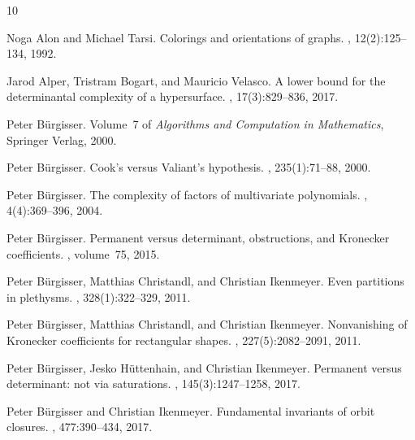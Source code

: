 \documentclass[11pt]{amsart}
\numberwithin{equation}{section}
\begin{document}

\def\cprime{$'$}
\begin{thebibliography}{10}

Noga Alon and Michael Tarsi.
\newblock Colorings and orientations of graphs.
, 12(2):125--134, 1992.

Jarod Alper, Tristram Bogart, and Mauricio Velasco.
\newblock A lower bound for the determinantal complexity of a hypersurface.
, 17(3):829--836, 2017.

Peter B{\"u}rgisser.
\newblock Volume~7 of {\em {A}lgorithms and {C}omputation in {M}athematics}, 
 Springer Verlag, 2000.

Peter B{\"u}rgisser.
\newblock Cook's versus {V}aliant's hypothesis.
, 235(1):71--88, 2000.

Peter B\"urgisser.
\newblock The complexity of factors of multivariate polynomials.
, 4(4):369--396, 2004.

Peter B{\"u}rgisser.
\newblock Permanent versus determinant, obstructions, and {K}ronecker coefficients.
, volume~75, 2015.

Peter B\"urgisser, Matthias Christandl, and Christian Ikenmeyer.
\newblock Even partitions in plethysms.
, 328(1):322--329, 2011.

Peter B{\"u}rgisser, Matthias Christandl, and Christian Ikenmeyer.
\newblock Nonvanishing of {K}ronecker coefficients for rectangular shapes.
, 227(5):2082--2091, 2011.

Peter B\"urgisser, Jesko H\"uttenhain, and Christian Ikenmeyer.
\newblock Permanent versus determinant: not via saturations.
, 145(3):1247--1258, 2017. 

Peter B\"urgisser and Christian Ikenmeyer.
\newblock Fundamental invariants of orbit closures.
, 477:390--434, 2017.


\end{thebibliography}
\end{document}
